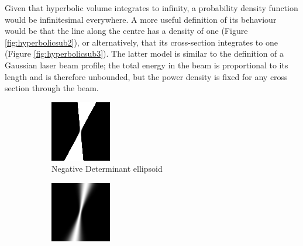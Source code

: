 \documentclass[a4paper, 11pt, titlepage]{article}
\begin{document}
      Given that hyperbolic volume integrates to infinity, a probability density function would be infinitesimal everywhere.  A more useful definition of its behaviour would be that the line along the centre has a density of one (Figure \ref{fig:hyperbolicsub2}), or alternatively, that its cross-section integrates to one (Figure \ref{fig:hyperbolicsub3}).
      The latter model is similar to the definition of a Gaussian laser beam profile; the total energy in the beam is proportional to its length and is therefore unbounded, but the power density is fixed for any cross section through the beam.
      \begin{figure}
      \centering
      \begin{subfigure}{.33\textwidth}
        \centering
        \includegraphics[width=.9\linewidth]{images/GaussianRay1.png}
        \caption{Negative Determinant ellipsoid}
        \label{fig:hyperbolicsub1}
      \end{subfigure}%
      \begin{subfigure}{.33\textwidth}
        \centering
        \includegraphics[width=.9\linewidth]{images/GaussianRay3.png}

\end{subfigure}
\end{figure}
\end{document}
